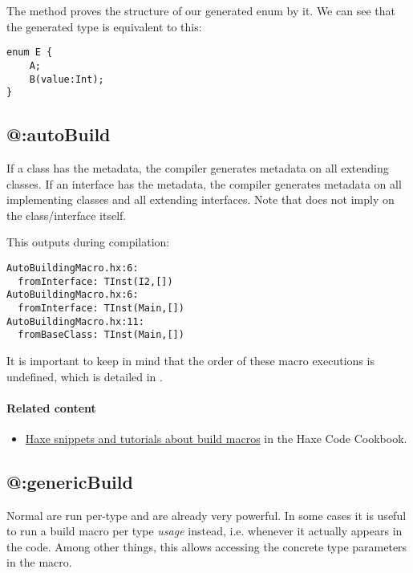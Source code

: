The  method proves the structure of our generated enum by  it. We can see that the generated type is equivalent to this:

\begin{lstlisting}
enum E {
	A;
	B(value:Int);
}
\end{lstlisting}


\subsection{@:autoBuild}
\label{macro-auto-build}

If a class has the  metadata, the compiler generates  metadata on all extending classes. If an interface has the  metadata, the compiler generates  metadata on all implementing classes and all extending interfaces. Note that  does not imply  on the class/interface itself.


This outputs during compilation:

\begin{lstlisting}
AutoBuildingMacro.hx:6:
  fromInterface: TInst(I2,[])
AutoBuildingMacro.hx:6:
  fromInterface: TInst(Main,[])
AutoBuildingMacro.hx:11:
  fromBaseClass: TInst(Main,[])
\end{lstlisting}

It is important to keep in mind that the order of these macro executions is undefined, which is detailed in .

\paragraph{Related content}
\begin{itemize}
	\item \href{http://code.haxe.org/tag/build-macro.html}{Haxe snippets and tutorials about build macros} in the Haxe Code Cookbook.
\end{itemize}

\subsection{@:genericBuild}
\label{macro-generic-build}

Normal  are run per-type and are already very powerful. In some cases it is useful to run a build macro per type \emph{usage} instead, i.e. whenever it actually appears in the code. Among other things, this allows accessing the concrete type parameters in the macro.

